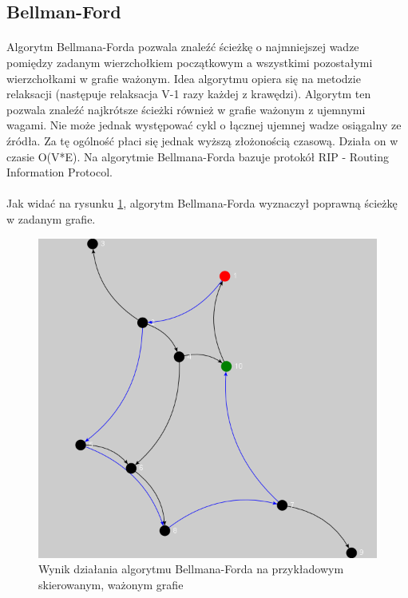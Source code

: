 \subsection{Bellman-Ford}
\paragraph{}
Algorytm Bellmana-Forda pozwala znaleźć ścieżkę o najmniejszej wadze pomiędzy zadanym wierzchołkiem początkowym a wszystkimi pozostałymi
wierzchołkami w grafie ważonym.
Idea algorytmu opiera się na metodzie relaksacji (następuje relaksacja V-1 razy każdej z krawędzi).
Algorytm ten pozwala znaleźć najkrótsze ścieżki również w grafie ważonym z ujemnymi wagami. 
Nie może jednak występować cykl o łącznej ujemnej wadze osiągalny ze źródła. 
Za tę ogólność płaci się jednak wyższą złożonością czasową. 
Działa on w czasie O(V*E).
Na algorytmie Bellmana-Forda bazuje protokół RIP - Routing Information Protocol.

\paragraph{}
Jak widać na rysunku \ref{fig:bellmanFord}, algorytm Bellmana-Forda wyznaczył poprawną ścieżkę w zadanym grafie.

\begin{figure}[!h]
 \centering
 \includegraphics{algorithms/bellmanFord}
 \caption{Wynik działania algorytmu Bellmana-Forda na przykładowym skierowanym, ważonym grafie}
 \label{fig:bellmanFord}
\end{figure}

